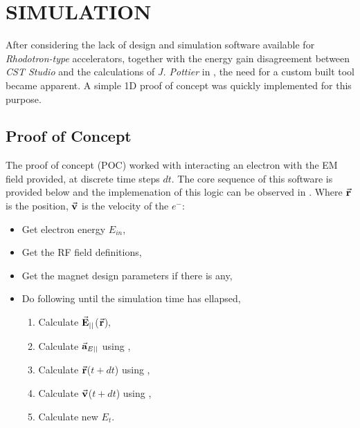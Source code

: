 \documentclass[a4paper,oneside,12pt]{report}
\numberwithin{equation}{chapter}
\begin{document}
\newpage


\chapter{SIMULATION} \label{ch:simulation}

After considering the lack of design and simulation software available for \textit{Rhodotron-type} accelerators, 
together with the energy gain disagreement between \textit{CST Studio} and the calculations of \textit{J. Pottier} in ,
the need for a custom built tool became apparent. A simple 1D proof of concept was quickly implemented for this purpose.
\section{Proof of Concept}
The proof of concept (POC) worked with interacting an electron with the EM field provided, at discrete time steps $dt$. 
The core sequence of this software is provided below and the implemenation of this logic can be observed in . 
Where $\vec{\textbf{r}}$ is the position, $\vec{\textbf{v}}$ is the velocity of the $e^-$:
\begin{itemize}
    \item Get electron energy $E_{in}$,
    \item Get the RF field definitions,
    \item Get the magnet design parameters if there is any,
    \item Do following until the simulation time has ellapsed,
    \begin{enumerate}
        \item Calculate $\vec{\textbf{E}}_{||}$($\vec{\textbf{r}}$),
        \item Calculate $\vec{\textbf{a}}_{E ||}$ using ,
        \item Calculate $\vec{\textbf{r}}$($t+dt$) using ,
        \item Calculate $\vec{\textbf{v}}$($t+dt$) using ,
        \item Calculate new $E_t$.
    \end{enumerate}
\end{itemize}
\clearpage
\end{document}
